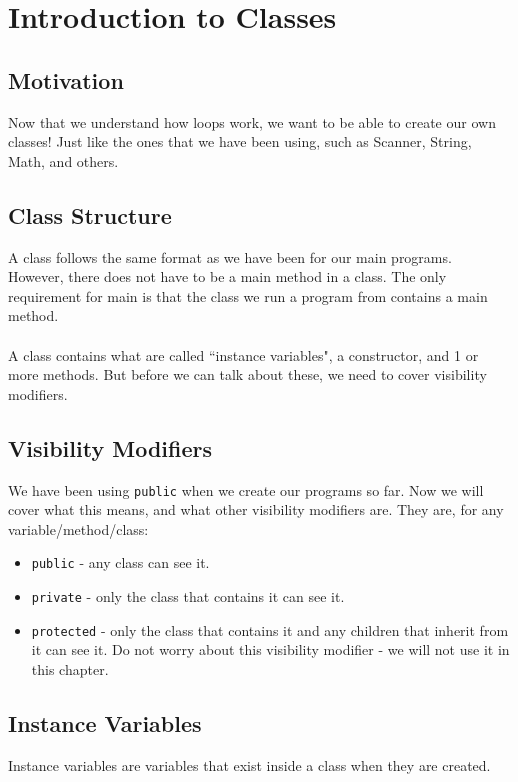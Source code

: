 \section{Introduction to Classes}

\subsection{Motivation}
Now that we understand how loops work, we want to be able to create our own classes! Just like the ones that we have been using, such as Scanner, String, Math, and others. 

\subsection{Class Structure}
A class follows the same format as we have been for our main programs. However, there does not have to be a main method in a class. The only requirement for main is that the class we run a program from contains a main method.
\\ \\
A class contains what are called ``instance variables", a constructor, and 1 or more methods. But before we can talk about these, we need to cover visibility modifiers.

\subsection{Visibility Modifiers}
We have been using \verb|public| when we create our programs so far. Now we will cover what this means, and what other visibility modifiers are. They are, for any variable/method/class:
\begin{itemize}
\item \verb|public| - any class can see it.
\item \verb|private| - only the class that contains it can see it.
\item \verb|protected| - only the class that contains it and any children that inherit from it can see it. Do not worry about this visibility modifier - we will not use it in this chapter.
\end{itemize}

\subsection{Instance Variables}
Instance variables are variables that exist inside a class when they are created. 

